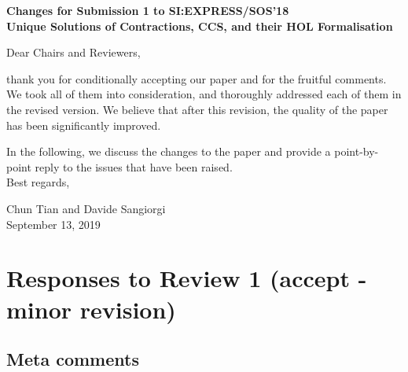 \begin{center}
\textbf{
{\small Changes for Submission 1 to SI:EXPRESS/SOS'18}\\[5mm]
{\large Unique Solutions of Contractions, CCS, and their HOL
  Formalisation
}}
\end{center}

Dear Chairs and Reviewers,

\vskip 10pt
\noindent

thank you for conditionally accepting our paper and for the fruitful
comments. We took all of them into consideration, and thoroughly
addressed each of them in the revised version. We believe that after
this revision, the quality of the paper has been significantly
improved.

In the following, we discuss the changes to the paper and provide a
point-by-point reply to the issues that have been raised.
\ \\

Best regards,
\begin{flushright}
  Chun Tian and Davide Sangiorgi \\
  September 13, 2019
\end{flushright}

\vspace{1cm}

\section*{Responses to Review 1 (accept - minor revision)}

\subsection*{Meta comments}

